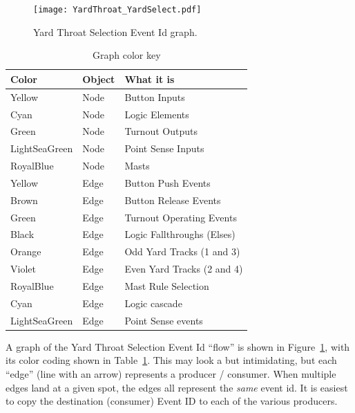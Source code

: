 \begin{figure}[hbpt]\begin{centering}%
\texttt{[image: YardThroat\_YardSelect.pdf]}
\caption{Yard Throat Selection Event Id graph.}
\label{fig:YardThroatYardSelect}
\end{centering}\end{figure}
\begin{table}[hbpt]\begin{centering}%
\begin{tabular}{|l|l|p{2in}|}
\hline
Color&Object&What it is\\
\hline
Yellow&Node&Button Inputs\\
\hline
Cyan&Node&Logic Elements\\
\hline
Green&Node&Turnout Outputs\\
\hline
LightSeaGreen&Node&Point Sense Inputs\\
\hline
RoyalBlue&Node&Masts\\
\hline 
Yellow&Edge&Button Push Events\\
\hline
Brown&Edge&Button Release Events\\
\hline
Green&Edge&Turnout Operating Events\\
\hline
Black&Edge&Logic Fallthroughs (Elses)\\
\hline
Orange&Edge&Odd Yard Tracks (1 and 3)\\
\hline
Violet&Edge&Even Yard Tracks (2 and 4)\\
\hline
RoyalBlue&Edge&Mast Rule Selection\\
\hline
Cyan&Edge&Logic cascade\\
\hline
LightSeaGreen&Edge&Point Sense events\\
\hline
\end{tabular}
\caption{Graph color key}
\label{tab:YardThroatYardSelect}
\end{centering}\end{table}

A graph of the Yard Throat Selection Event Id ``flow'' is shown in
Figure~\ref{fig:YardThroatYardSelect}, with its color coding shown in
Table~\ref{tab:YardThroatYardSelect}. This may look a but intimidating, but
each ``edge'' (line with an arrow) represents a producer / consumer. When
multiple edges land at a given spot, the edges all represent the \textit{same}
event id. It is easiest to copy the destination (consumer) Event ID to each of
the various producers. 

